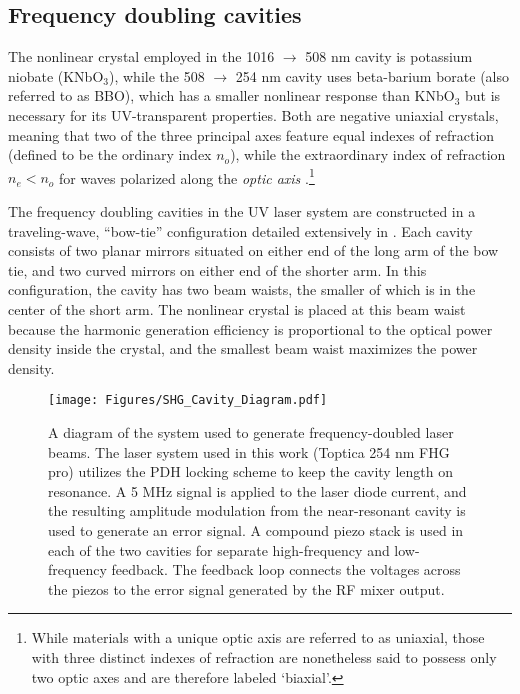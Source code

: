 \documentclass [10pt, twoside] {uwthesis}[2012/04/02]
\begin{document}
\subsection{Frequency doubling cavities}
The nonlinear crystal employed in the 1016 $\rightarrow$ 508 nm cavity is potassium niobate (KNbO$_3$), while the 508 $\rightarrow$ 254 nm cavity uses beta-barium borate (also referred to as BBO), which has a smaller nonlinear response than KNbO$_3$ but is necessary for its UV-transparent properties. Both are negative uniaxial crystals, meaning that two of the three principal axes feature equal indexes of refraction (defined to be the ordinary index $n_o$), while the extraordinary index of refraction $n_e < n_o$ for waves polarized along the \textit{optic axis} \cite{New}.\footnote{While materials with a unique optic axis are referred to as uniaxial, those with three distinct indexes of refraction are nonetheless said to possess only two optic axes and are therefore labeled `biaxial'.}

The frequency doubling cavities in the UV laser system are constructed in a traveling-wave, ``bow-tie'' configuration detailed extensively in \cite{Nagourney}. Each cavity consists of two planar mirrors situated on either end of the long arm of the bow tie, and two curved mirrors on either end of the shorter arm. In this configuration, the cavity has two beam waists, the smaller of which is in the center of the short arm. The nonlinear crystal is placed at this beam waist because the harmonic generation efficiency is proportional to the optical power density inside the crystal, and the smallest beam waist maximizes the power density.

\begin{figure}
\begin{center}
\texttt{[image: Figures/SHG\_Cavity\_Diagram.pdf]}
\end{center}
\caption[Second harmonic generation cavity]
{\narrower A diagram of the system used to generate frequency-doubled laser beams. The laser system used in this work (Toptica 254 nm FHG pro) utilizes the PDH locking scheme to keep the cavity length on resonance. A 5 MHz signal is applied to the laser diode current, and the resulting amplitude modulation from the near-resonant cavity is used to generate an error signal. A compound piezo stack is used in each of the two cavities for separate high-frequency and low-frequency feedback. The feedback loop connects the voltages across the piezos to the error signal generated by the RF mixer output.}
\label{CavityDiagram}
\end{figure}
\end{document}
